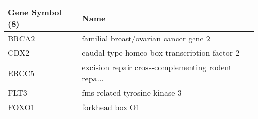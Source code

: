 \begin{tabular}{ll}
\toprule
Gene Symbol (8) &                                               Name \\
\midrule
          BRCA2 &              familial breast/ovarian cancer gene 2 \\
           CDX2 &       caudal type homeo box transcription factor 2 \\
          ERCC5 & excision repair cross-complementing rodent repa... \\
           FLT3 &                      fms-related tyrosine kinase 3 \\
          FOXO1 &                                    forkhead box O1 \\
\bottomrule
\end{tabular}
